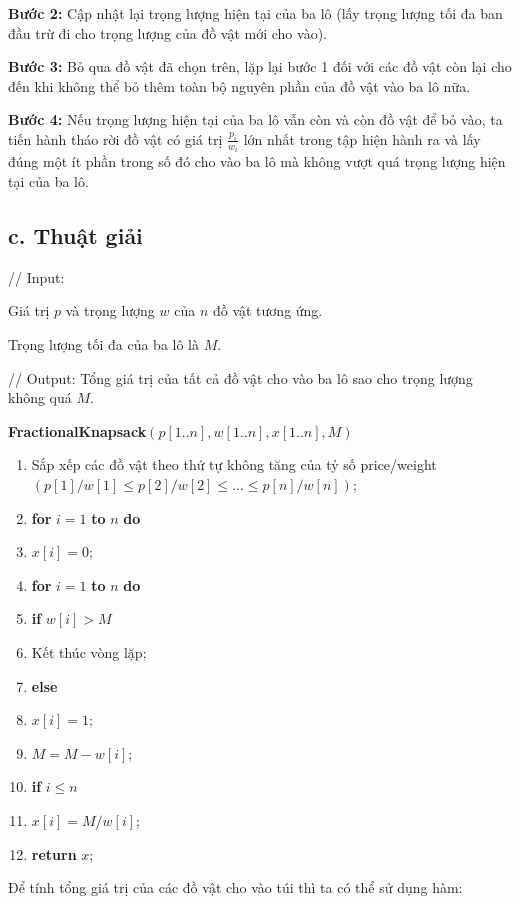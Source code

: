 \documentclass[12pt, a4paper, fleqn]{article}
\begin{document}
	\textbf{Bước 2:} Cập nhật lại trọng lượng hiện tại của ba lô (lấy trọng lượng tối đa ban đầu trừ đi cho trọng lượng của đồ vật mới cho vào).

	\textbf{Bước 3:} Bỏ qua đồ vật đã chọn trên, lặp lại bước 1 đối với các đồ vật còn lại cho đến khi không thể bỏ thêm toàn bộ nguyên phần của đồ vật vào ba lô nữa.
	
	\textbf{Bước 4:} Nếu trọng lượng hiện tại của ba lô vẫn còn và còn đồ vật để bỏ vào, ta tiến hành tháo rời đồ vật có giá trị $\displaystyle \frac{p_i}{w_i}$ lớn nhất trong tập hiện hành ra và lấy đúng một ít phần trong số đó cho vào ba lô mà không vượt quá trọng lượng hiện tại của ba lô.
	
	\subsection*{c. Thuật giải}
	
	// Input:
	
	Giá trị $p$ và trọng lượng $w$ của $n$ đồ vật tương ứng.
	
	Trọng lượng tối đa của ba lô là $M$.
	
	// Output: Tổng giá trị của tất cả đồ vật cho vào ba lô sao cho trọng lượng không quá $M$.
	
	\textbf{FractionalKnapsack}$(p[1..n], w[1..n], x[1..n], M)$
	\begin{enumerate}
		\item Sắp xếp các đồ vật theo thứ tự không tăng của tỷ số price/weight $(p[1] / w[1] \leq p[2] / w[2] \leq ... \leq p[n] / w[n])$;
		\item \textbf{for} $i = 1$ \textbf{to} $n$ \textbf{do}
		\item \qquad $x[i] = 0$;
		\item \textbf{for} $i = 1$ \textbf{to} $n$ \textbf{do}
		\item \qquad \textbf{if} $w[i] > M$
		\item \qquad \qquad Kết thúc vòng lặp;
		\item \qquad \textbf{else}
		\item \qquad \qquad $x[i] = 1$;
		\item \qquad \qquad $M = M - w[i]$;
		\item \textbf{if} $i \leq n$
		\item \qquad $x[i] = M/w[i]$;
		\item \textbf{return} $x$;
	\end{enumerate}

	Để tính tổng giá trị của các đồ vật cho vào túi thì ta có thể sử dụng hàm:
	
\end{document}
